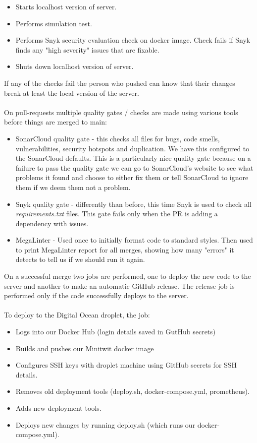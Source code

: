 \begin{itemize}
    \item Starts localhost version of server.
    \item Performs simulation test.
    \item Performs Snyk security evaluation check on docker image. Check fails if Snyk finds any "high severity" issues that are fixable.
    \item Shuts down localhost version of server.
\end{itemize}

If any of the checks fail the person who pushed can know that their changes break at least the local version of the server.
\\\\
On pull-requests multiple quality gates / checks are made using various tools before things are merged to main:

\begin{itemize}
    \item SonarCloud quality gate - this checks all files for bugs, code smells, vulnerabilities, security hotspots and duplication. We have this configured to the SonarCloud defaults. This is a particularly nice quality gate because on a failure to pass the quality gate we can go to SonarCloud's website to see what problems it found and choose to either fix them or tell SonarCloud to ignore them if we deem them not a problem.
    \item Snyk quality gate - differently than before, this time Snyk is used to check all \textit{requirements.txt} files. This gate fails only when the PR is adding a dependency with issues.
    \item MegaLinter - Used once to initially format code to standard styles. Then used to print MegaLinter report for all merges, showing how many "errors" it detects to tell us if we should run it again.
\end{itemize}

On a successful merge two jobs are performed, one to deploy the new code to the server and another to make an automatic GitHub release. The release job is performed only if the code successfully deploys to the server.
\\\\
To deploy to the Digital Ocean droplet, the job:

\begin{itemize}
    \item Logs into our Docker Hub (login details saved in GutHub secrets)
    \item Builds and pushes our Minitwit docker image %
    \item Configures SSH keys with droplet machine using GitHub secrets for SSH details.
    \item Removes old deployment tools (deploy.sh, docker-compose.yml, prometheus).
    \item Adds new deployment tools.
    \item Deploys new changes by running deploy.sh (which runs our docker-compose.yml).
\end{itemize}

